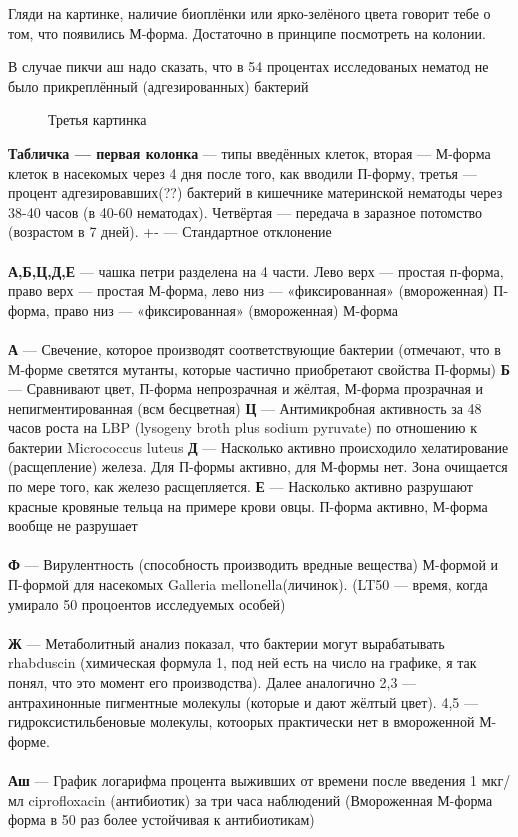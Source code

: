 Гляди на картинке, наличие биоплёнки или ярко-зелёного цвета говорит тебе о том, что появились М-форма. Достаточно в принципе посмотреть на колонии. 

В случае пикчи аш надо сказать, что в 54 процентах исследованых нематод не было прикреплённый (адгезированных) бактерий

\begin{figure}[H]\label{ul}
	\caption{Третья картинка}
\end{figure} 
\textbf{Табличка — первая колонка} — типы введённых клеток, вторая — М-форма клеток в насекомых через 4 дня после того, как вводили П-форму, третья — процент адгезировавших(??) бактерий в кишечнике материнской нематоды через 38-40 часов (в 40-60 нематодах). Четвёртая — передача в заразное потомство (возрастом в 7 дней). +- — Стандартное отклонение
\\
\\
\textbf{А,Б,Ц,Д,Е} — чашка петри разделена на 4 части. Лево верх — простая п-форма, право верх — простая М-форма, лево низ — «фиксированная» (вмороженная) П-форма, право низ — «фиксированная» (вмороженная) М-форма
\\
\\
\textbf{А} — Свечение, которое производят соответствующие бактерии (отмечают, что в М-форме светятся мутанты, которые частично приобретают свойства П-формы)
\textbf{Б} — Сравнивают цвет, П-форма непрозрачная и жёлтая, М-форма прозрачная и непигментированная (всм бесцветная)
\textbf{Ц} — Антимикробная активность за 48 часов роста на LBP (lysogeny broth plus sodium pyruvate) по отношению к бактерии Micrococcus luteus
\textbf{Д} — Насколько активно происходило хелатирование (расщепление) железа. Для П-формы активно, для М-формы нет. Зона очищается по мере того, как железо расщепляется. 
\textbf{Е} — Насколько активно разрушают красные кровяные тельца на примере крови овцы. П-форма активно, М-форма вообще не разрушает
\\
\\
\textbf{Ф} — Вирулентность (способность производить вредные вещества) М-формой и П-формой для насекомых Galleria mellonella(личинок). (LT50 — время, когда умирало 50 процоентов исследуемых особей)
\\
\\
\textbf{Ж} — Метаболитный анализ показал, что бактерии могут вырабатывать rhabduscin (химическая формула 1, под ней есть на число на графике, я так понял, что это момент его производства). Далее аналогично 2,3 — антрахинонные пигментные молекулы (которые и дают жёлтый цвет). 4,5 — гидроксистильбеновые молекулы, котоорых практически нет в вмороженной М-форме. 
\\
\\
\textbf{Аш} — График логарифма процента выживших от времени после введения 1 мкг/мл ciprofloxacin (антибиотик) за три часа наблюдений (Вмороженная М-форма форма в 50 раз более устойчивая к антибиотикам)

